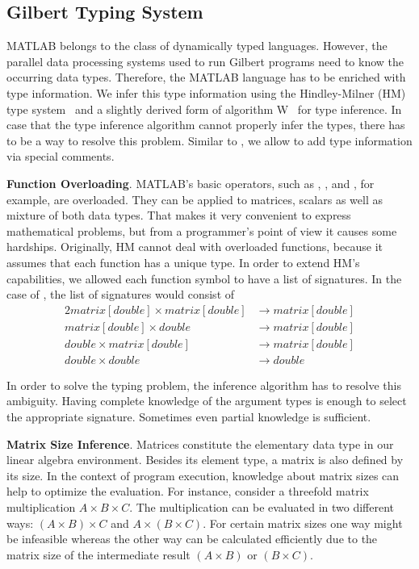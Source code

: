 \subsection{Gilbert Typing System}
\label{sec:gilberttyping}

MATLAB belongs to the class of dynamically typed languages.
However, the parallel data processing systems used to run Gilbert programs need to know the occurring data types.
Therefore, the MATLAB language has to be enriched with type information. 
We infer this type information using the Hindley-Milner (HM) type system~\cite{hindley:tams1969a,milner:jcss1978a} and a slightly derived form of algorithm W~\cite{damas:1982a} for type inference. 
In case that the type inference algorithm cannot properly infer the types, there has to be a way to resolve this problem. 
Similar to \cite{furr:2009a}, we allow to add type information via special comments.

\textbf{Function Overloading}. MATLAB's basic operators, such as \code{+}, \code{-}, \code{/} and \code{*}, for example, are overloaded.
They can be applied to matrices, scalars as well as mixture of both data types.
That makes it very convenient to express mathematical problems, but from a programmer's point of view it causes some hardships.
Originally, HM cannot deal with overloaded functions, because it assumes that each function has a unique type.
In order to extend HM's capabilities, we allowed each function symbol to have a list of signatures.
In the case of \code{+}, the list of signatures would consist of 
\small
\begin{alignat*}{2}
matrix[double] \times matrix[double] &\rightarrow matrix[double]\\
matrix[double] \times double &\rightarrow matrix[double]\\
double \times matrix[double] &\rightarrow matrix[double]\\
double \times double &\rightarrow double
\end{alignat*}
\normalsize

In order to solve the typing problem, the inference algorithm has to resolve this ambiguity.
Having complete knowledge of the argument types is enough to select the appropriate signature.
Sometimes even partial knowledge is sufficient.

\textbf{Matrix Size Inference}. Matrices constitute the elementary data type in our linear algebra environment.
Besides its element type, a matrix is also defined by its size.
In the context of program execution, knowledge about matrix sizes can help to optimize the evaluation.
For instance, consider a threefold matrix multiplication $A\times B\times C$.
The multiplication can be evaluated in two different ways: $(A\times B)\times C$ and $A\times(B\times C)$.
For certain matrix sizes one way might be infeasible whereas the other way can be calculated efficiently due to the matrix size of the intermediate result $(A\times B)$ or $(B\times C)$.

